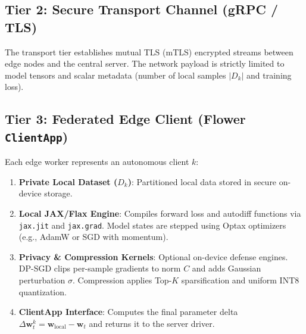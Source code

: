 \documentclass[11pt,a4paper,titlepage]{report}
\begin{document}
\subsection{Tier 2: Secure Transport Channel (gRPC / TLS)}
The transport tier establishes mutual TLS (mTLS) encrypted streams between edge nodes and the central server. The network payload is strictly limited to model tensors and scalar metadata (number of local samples $|D_k|$ and training loss).

\subsection{Tier 3: Federated Edge Client (Flower \texttt{ClientApp})}
Each edge worker represents an autonomous client $k$:
\begin{enumerate}[leftmargin=*]
    \item \textbf{Private Local Dataset ($D_k$)}: Partitioned local data stored in secure on-device storage.
    \item \textbf{Local JAX/Flax Engine}: Compiles forward loss and autodiff functions via \texttt{jax.jit} and \texttt{jax.grad}. Model states are stepped using Optax optimizers (e.g., AdamW or SGD with momentum).
    \item \textbf{Privacy \& Compression Kernels}: Optional on-device defense engines. DP-SGD clips per-sample gradients to norm $C$ and adds Gaussian perturbation $\sigma$. Compression applies Top-$K$ sparsification and uniform INT8 quantization.
    \item \textbf{ClientApp Interface}: Computes the final parameter delta $\Delta\mathbf{w}_t^k = \mathbf{w}_{\text{local}} - \mathbf{w}_t$ and returns it to the server driver.
\end{enumerate}
\end{document}
